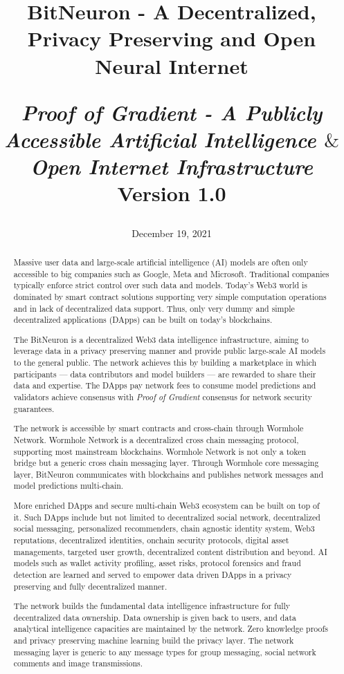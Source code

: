 \documentclass[11pt,letterpaper]{article}
\title{
\begin{medium}
\vspace{15pt}
  \textsf{BitNeuron - A Decentralized, Privacy Preserving and Open Neural Internet}
\end{medium} 

\begin{small}
\vspace{15pt}
  \textsf{\emph{Proof of Gradient - A Publicly Accessible Artificial Intelligence $\&$ Open Internet Infrastructure}}\\
  \textsf{Version 1.0}
\vspace{-20pt}
\end{small} 
\date{December 19, 2021}
}
\begin{document}
\maketitle
\vspace{5pt}
\begin{abstract}
Massive user data and large-scale artificial intelligence (AI) models are often only accessible to big companies such as Google, Meta and Microsoft. Traditional companies typically enforce strict control over such data and models. Today's Web3 world is dominated by smart contract solutions supporting very simple computation operations and in lack of decentralized data support. Thus, only very dummy and simple decentralized applications (DApps) can be built on today's blockchains.

The BitNeuron is a decentralized Web3 data intelligence infrastructure, aiming to leverage data in a privacy preserving manner and provide public large-scale AI models to the general public. The network achieves this by building a marketplace in which participants --- data contributors and model builders --- are rewarded to share their data and expertise. The DApps pay network fees to consume model predictions and validators achieve consensus with \emph{Proof of Gradient} consensus for network security guarantees.

The network is accessible by smart contracts and cross-chain through Wormhole Network. Wormhole Network is a decentralized cross chain messaging protocol, supporting most mainstream blockchains. Wormhole Network is not only a token bridge but a generic cross chain messaging layer. Through Wormhole core messaging layer, BitNeuron communicates with blockchains and publishes network messages and model predictions multi-chain.

More enriched DApps and secure multi-chain Web3 ecosystem can be built on top of it. Such DApps include but not limited to decentralized social network, decentralized social messaging, personalized recommenders, chain agnostic identity system, Web3 reputations, decentralized identities, onchain security protocols, digital asset managements, targeted user growth, decentralized content distribution and beyond. AI models such as wallet activity profiling, asset risks, protocol forensics and fraud detection are learned and served to empower data driven DApps in a privacy preserving and fully decentralized manner.

The network builds the fundamental data intelligence infrastructure for fully decentralized data ownership. Data ownership is given back to users, and data analytical intelligence capacities are maintained by the network. Zero knowledge proofs and privacy preserving machine learning build the privacy layer. The network messaging layer is generic to any message types for group messaging, social network comments and image transmissions.
\end{abstract}
\end{document}
